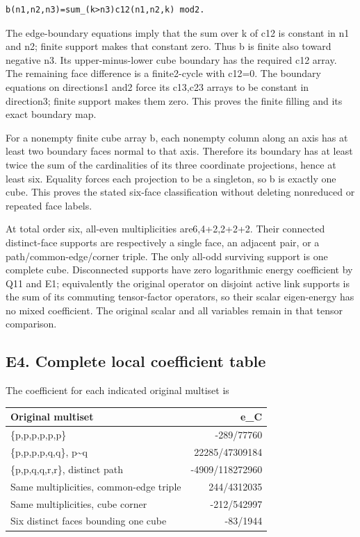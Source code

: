 \documentclass[11pt,a4paper]{article}
\newcounter{none}
\renewcommand{\[}{\begingroup\small\originaldisplaystart}
\renewcommand{\]}{\originaldisplayend\endgroup}
\begin{document}
\begin{verbatim}
b(n1,n2,n3)=sum_(k>n3)c12(n1,n2,k) mod2.
\end{verbatim}

The edge-boundary equations imply that the sum over k of c12 is constant
in n1 and n2; finite support makes that constant zero. Thus b is finite
also toward negative n3. Its upper-minus-lower cube boundary has the
required c12 array. The remaining face difference is a finite2-cycle
with c12=0. The boundary equations on directions1 and2 force its c13,c23
arrays to be constant in direction3; finite support makes them zero.
This proves the finite filling and its exact boundary map.

For a nonempty finite cube array b, each nonempty column along an axis
has at least two boundary faces normal to that axis. Therefore its
boundary has at least twice the sum of the cardinalities of its three
coordinate projections, hence at least six. Equality forces each
projection to be a singleton, so b is exactly one cube. This proves the
stated six-face classification without deleting nonreduced or repeated
face labels.

At total order six, all-even multiplicities are6,4+2,2+2+2. Their
connected distinct-face supports are respectively a single face, an
adjacent pair, or a path/common-edge/corner triple. The only all-odd
surviving support is one complete cube. Disconnected supports have zero
logarithmic energy coefficient by Q11 and E1; equivalently the original
operator on disjoint active link supports is the sum of its commuting
tensor-factor operators, so their scalar eigen-energy has no mixed
coefficient. The original scalar and all variables remain in that tensor
comparison.

\subsection{E4. Complete local coefficient
table}\label{e4.-complete-local-coefficient-table}

The coefficient for each indicated original multiset is

{\def\LTcaptype{none} %
\begin{longtable}[]{@{}lr@{}}
\toprule\noalign{}
Original multiset & e\_C \\
\midrule\noalign{}
\endhead
\bottomrule\noalign{}
\endlastfoot
\{p,p,p,p,p,p\} & -289/77760 \\
\{p,p,p,p,q,q\}, p\textasciitilde q & 22285/47309184 \\
\{p,p,q,q,r,r\}, distinct path & -4909/118272960 \\
Same multiplicities, common-edge triple & 244/4312035 \\
Same multiplicities, cube corner & -212/542997 \\
Six distinct faces bounding one cube & -83/1944 \\
\end{longtable}
}
\end{document}
